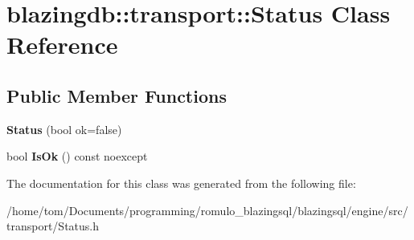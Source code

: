 \hypertarget{classblazingdb_1_1transport_1_1Status}{}\section{blazingdb\+:\+:transport\+:\+:Status Class Reference}
\label{classblazingdb_1_1transport_1_1Status}
\subsection*{Public Member Functions}
\begin{DoxyCompactItemize}
\item 
\mbox{\label{classblazingdb_1_1transport_1_1Status_ac767bade5db831c50cf43c83d0b89997}} 
{\bfseries Status} (bool ok=false)
\item 
\mbox{\label{classblazingdb_1_1transport_1_1Status_aefd5c8dc7f04c4b44b1787b878232810}} 
bool {\bfseries Is\+Ok} () const noexcept
\end{DoxyCompactItemize}


The documentation for this class was generated from the following file\+:\begin{DoxyCompactItemize}
\item 
/home/tom/\+Documents/programming/romulo\+\_\+blazingsql/blazingsql/engine/src/transport/Status.\+h\end{DoxyCompactItemize}
